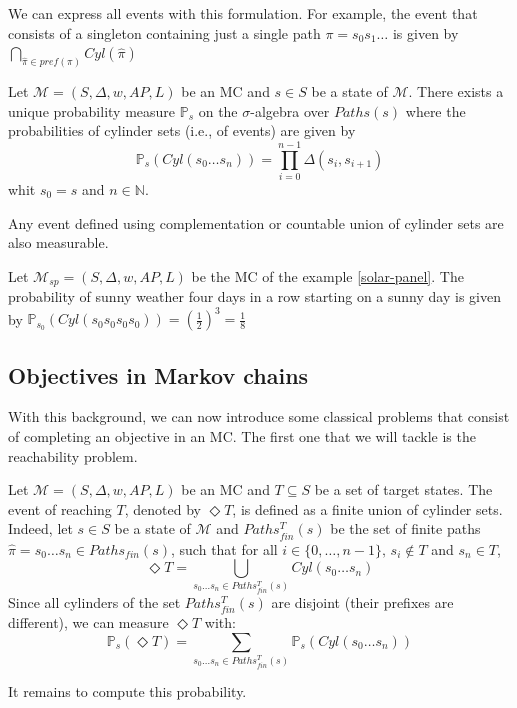 We can express all events with this formulation. For example, the event that consists of a singleton containing just a single path $\pi = s_0s_1\dots$ is given by $\bigcap_{\hat{\pi} \in pref(\pi)} Cyl(\hat{\pi})$

\begin{theorem}\label{theo1}
  Let $\mathcal{M}=(S, \Delta, w, AP, L)$ be an MC and $s \in S$ be a state of $\mathcal{M}$. There exists a unique probability measure $\mathbb{P}_s$ on the
  $\sigma$-algebra over $Paths(s)$ where the probabilities of cylinder sets (i.e., of events) are given by
  \[
    \mathbb{P}_s(Cyl(s_0 \dots s_n)) = \prod_{i = 0}^{n - 1} \Delta(s_i, s_{i+1})
  \]
  whit $s_0 = s$ and $n \in \mathbb{N}$.
\end{theorem}
\begin{corollary}
Any event defined using complementation or countable union of cylinder sets are also measurable.
\end{corollary}

\begin{example}
  Let $\mathcal{M}_{sp} = (S, \Delta, w, AP, L)$ be the MC of the example \ref{solar-panel}. The probability of sunny weather four days in a row starting on a sunny day is given
  by $\mathbb{P}_{s_0}(Cyl(s_0s_0s_0s_0)) = (\frac{1}{2})^3 = \frac{1}{8}$
\end{example}

\subsection{Objectives in Markov chains}

With this background, we can now introduce some classical problems that consist
of completing an objective in an MC. The first one that we will tackle is the reachability problem.
\begin{definition}
  Let $\mathcal{M} = (S, \Delta, w, AP, L)$ be an MC and $T \subseteq S$ be a set of target states. The event of reaching $T$, denoted by $\Diamond T$,
  is defined as a finite union of cylinder sets. Indeed, let $s \in S$ be a state of $\mathcal{M}$ and $Paths_{fin}^T(s)$ be the set of finite paths $\hat{\pi} = s_0 \dots s_n \in Paths_{fin}(s)$, such that for all $i \in \{0, \dots, n-1 \}, \, s_i \not \in T$ and $s_n \in T$,
  \[ \Diamond T = \bigcup_{s_0 \dots s_n \in Paths_{fin}^T(s)} Cyl(s_0 \dots s_n) \]
  Since all cylinders of the set $Paths_{fin}^T(s)$ are disjoint (their prefixes are different), we can measure $\Diamond T$ with:
  \[
    \mathbb{P}_s(\Diamond T) = \sum_{s_0 \dots s_n \in Paths_{fin}^T(s)}  \mathbb{P}_s(Cyl(s_0 \dots s_n))
  \]
\end{definition}
It remains to compute this probability.

